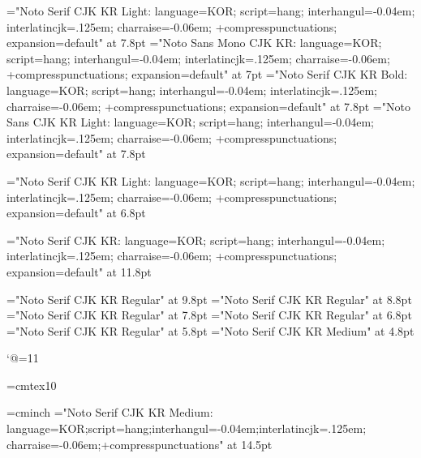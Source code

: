 \sethangulfont\eightmj="Noto Serif CJK KR Light:%
  language=KOR;%
  script=hang;%
  interhangul=-0.04em;%
  interlatincjk=.125em;%
  charraise=-0.06em;%
  +compresspunctuations;%
  expansion=default" at 7.8pt
\sethangulfont\eighttz="Noto Sans Mono CJK KR:%
  language=KOR;%
  script=hang;%
  interhangul=-0.04em;%
  interlatincjk=.125em;%
  charraise=-0.06em;%
  +compresspunctuations;%
  expansion=default" at 7pt
\sethangulfont\eightbd="Noto Serif CJK KR Bold:%
  language=KOR;%
  script=hang;%
  interhangul=-0.04em;%
  interlatincjk=.125em;%
  charraise=-0.06em;%
  +compresspunctuations;%
  expansion=default" at 7.8pt
\sethangulfont\eightgt="Noto Sans CJK KR Light:%
  language=KOR;%
  script=hang;%
  interhangul=-0.04em;%
  interlatincjk=.125em;%
  charraise=-0.06em;%
  +compresspunctuations;%
  expansion=default" at 7.8pt

\sethangulfont\sevenmj="Noto Serif CJK KR Light:%
  language=KOR;%
  script=hang;%
  interhangul=-0.04em;%
  interlatincjk=.125em;%
  charraise=-0.06em;%
  +compresspunctuations;%
  expansion=default" at 6.8pt

\sethangulfont\twelvemj="Noto Serif CJK KR:%
  language=KOR;%
  script=hang;%
  interhangul=-0.04em;%
  interlatincjk=.125em;%
  charraise=-0.06em;%
  +compresspunctuations;%
  expansion=default" at 11.8pt

\font\texthangul="Noto Serif CJK KR Regular" at 9.8pt
\font\texthangulnine="Noto Serif CJK KR Regular" at 8.8pt
\font\texthanguleight="Noto Serif CJK KR Regular" at 7.8pt
\font\scripthangul="Noto Serif CJK KR Regular" at 6.8pt
\font\scripthangulsix="Noto Serif CJK KR Regular" at 5.8pt
\font\scriptscripthangul="Noto Serif CJK KR Medium" at 4.8pt

\catcode`@=11 %

\font\tentex=cmtex10

\font\inchhigh=cminch
\let\Glatintitlefont=\titlefont
\sethangulfont\Ghangultitlefont="Noto Serif CJK KR Medium:%
  language=KOR;script=hang;interhangul=-0.04em;interlatincjk=.125em;%
  charraise=-0.06em;+compresspunctuations" at 14.5pt
\def\titlefont{\Glatintitlefont\Ghangultitlefont}

